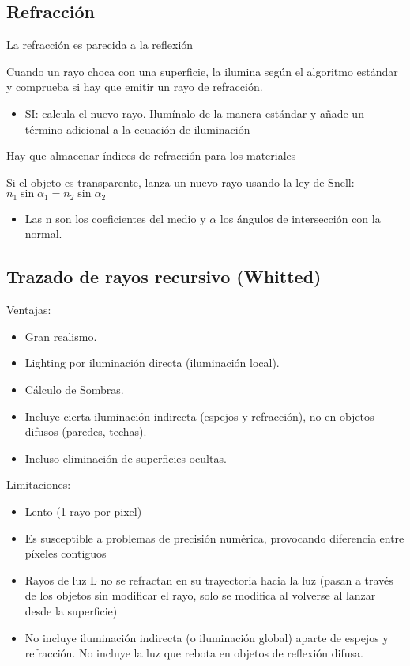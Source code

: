 \subsection{Refracción}
La refracción es parecida a la reflexión

Cuando un rayo choca con una superficie, la ilumina según el algoritmo estándar y comprueba si hay que emitir un rayo de
refracción.
\begin{itemize}
	\item SI: calcula el nuevo rayo. Ilumínalo de la manera estándar y añade un término adicional a la ecuación de iluminación
\end{itemize}

Hay que almacenar índices de refracción para los materiales

Si el objeto es transparente, lanza un nuevo rayo usando la ley de Snell: $n_1 \sin \alpha_1 = n_2 \sin \alpha_2$
\begin{itemize}
	\item Las n son los coeficientes del medio y $\alpha$ los ángulos de intersección con la normal.
\end{itemize}

\subsection{Trazado de rayos recursivo (Whitted)}
Ventajas:
\begin{itemize}
	\item Gran realismo.
	\item Lighting por iluminación directa (iluminación local).
	\item Cálculo de Sombras.
	\item Incluye cierta iluminación indirecta (espejos y refracción), no en objetos difusos (paredes, techas).
	\item Incluso eliminación de superficies ocultas.
\end{itemize}

Limitaciones:
\begin{itemize}
	\item Lento (1 rayo por pixel)
	\item Es susceptible a problemas de precisión numérica, provocando diferencia entre píxeles contiguos
	\item Rayos de luz L no se refractan en su trayectoria hacia la luz (pasan a través de los objetos sin modificar el rayo, solo se modifica al volverse al lanzar desde la superficie)
	\item No incluye iluminación indirecta (o iluminación global) aparte de espejos y refracción. No incluye la luz que rebota en objetos de reflexión difusa.
\end{itemize}

